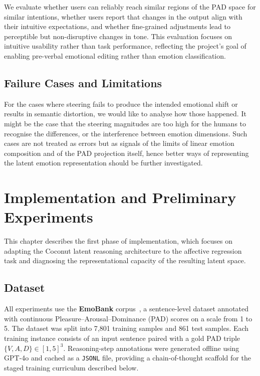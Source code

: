 \documentclass[12pt,twoside]{report}
\begin{document}
We evaluate whether users can reliably reach similar regions of the PAD space for similar intentions, whether users report that changes in the output align with their intuitive expectations, and whether fine-grained adjustments lead to perceptible but non-disruptive changes in tone. This evaluation focuses on intuitive usability rather than task performance, reflecting the project’s goal of enabling pre-verbal emotional editing rather than emotion classification.

\section{Failure Cases and Limitations}

For the cases where steering fails to produce the intended emotional shift or results in semantic distortion, we would like to analyse how those happened. It might be the case that the steering magnitudes are too high for the humans to recognise the differences, or the interference between emotion dimensions. Such cases are not treated as errors but as signals of the limits of linear emotion composition and of the PAD projection itself, hence better ways of representing the latent emotion representation should be further investigated.

\chapter{Implementation and Preliminary Experiments}

This chapter describes the first phase of implementation, which focuses on adapting the Coconut latent reasoning architecture to the affective regression task and diagnosing the representational capacity of the resulting latent space.

\section{Dataset}

All experiments use the \textbf{EmoBank} corpus~\cite{buechel-hahn-2017-emobank}, a sentence-level dataset annotated with continuous Pleasure--Arousal--Dominance (PAD) scores on a scale from 1 to 5.
The dataset was split into 7{,}801 training samples and 861 test samples.
Each training instance consists of an input sentence paired with a gold PAD triple $\{V, A, D\} \in [1,5]^3$.
Reasoning-step annotations were generated offline using GPT-4o and cached as a \texttt{JSONL} file, providing a chain-of-thought scaffold for the staged training curriculum described below.
\end{document}
